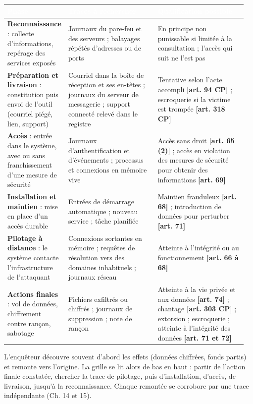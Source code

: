 \begin{longtable}{p{0.20\linewidth}p{0.38\linewidth}p{0.38\linewidth}}
\rowcolor{TableauEntete}\textcolor{white}{\bfseries Phase} & \textcolor{white}{\bfseries Traces à rechercher} & \textcolor{white}{\bfseries Qualification possible} \\ \hline
\textbf{Reconnaissance} : collecte d'informations, repérage des services exposés & Journaux du pare-feu et des serveurs ; balayages répétés d'adresses ou de ports & En principe non punissable si limitée à la consultation ; l'accès qui suit ne l'est pas \\
\textbf{Préparation et livraison} : constitution puis envoi de l'outil (courriel piégé, lien, support) & Courriel dans la boîte de réception et ses en-têtes ; journaux du serveur de messagerie ; support connecté relevé dans le registre & Tentative selon l'acte accompli \textbf{[art. 94 CP]} ; escroquerie si la victime est trompée \textbf{[art. 318 CP]} \\
\textbf{Accès} : entrée dans le système, avec ou sans franchissement d'une mesure de sécurité & Journaux d'authentification et d'événements ; processus et connexions en mémoire vive & Accès sans droit \textbf{[art. 65 (2)]} ; accès en violation des mesures de sécurité pour obtenir des informations \textbf{[art. 69]} \\
\textbf{Installation et maintien} : mise en place d'un accès durable & Entrées de démarrage automatique ; nouveau service ; tâche planifiée & Maintien frauduleux \textbf{[art. 68]} ; introduction de données pour perturber \textbf{[art. 71]} \\
\textbf{Pilotage à distance} : le système contacte l'infrastructure de l'attaquant & Connexions sortantes en mémoire ; requêtes de résolution vers des domaines inhabituels ; journaux réseau & Atteinte à l'intégrité ou au fonctionnement \textbf{[art. 66 à 68]} \\
\textbf{Actions finales} : vol de données, chiffrement contre rançon, sabotage & Fichiers exfiltrés ou chiffrés ; journaux de suppression ; note de rançon & Atteinte à la vie privée et aux données \textbf{[art. 74]} ; chantage \textbf{[art. 303 CP]} ; extorsion ; escroquerie ; atteinte à l'intégrité des données \textbf{[art. 71 et 72]} \\
\end{longtable}

L'enquêteur découvre souvent d'abord les effets (données chiffrées, fonds partis) et remonte vers l'origine. La grille se lit alors de bas en haut : partir de l'action finale constatée, chercher la trace de pilotage, puis d'installation, d'accès, de livraison, jusqu'à la reconnaissance. Chaque remontée se corrobore par une trace indépendante (Ch. 14 et 15).

